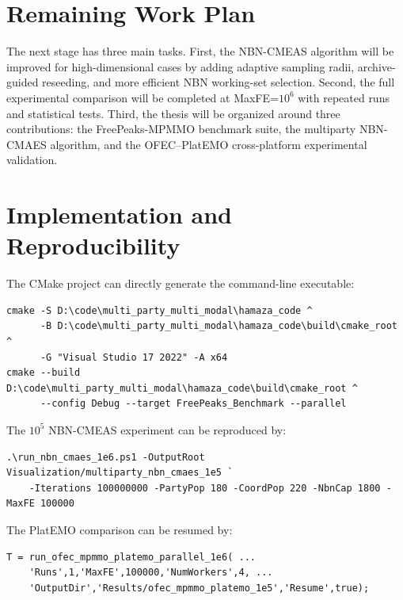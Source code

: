\documentclass[12pt,a4paper]{article}
\newcommand{\code}[1]{\texttt{#1}}
\begin{document}
\section{Remaining Work Plan}

The next stage has three main tasks. First, the NBN-CMEAS algorithm will be improved
for high-dimensional cases by adding adaptive sampling radii, archive-guided reseeding,
and more efficient NBN working-set selection. Second, the full experimental comparison
will be completed at MaxFE=$10^6$ with repeated runs and statistical tests. Third, the
thesis will be organized around three contributions: the FreePeaks-MPMMO benchmark
suite, the multiparty NBN-CMAES algorithm, and the OFEC--PlatEMO cross-platform
experimental validation.

\section*{Implementation and Reproducibility}

The CMake project can directly generate the command-line executable:
\begin{verbatim}
cmake -S D:\code\multi_party_multi_modal\hamaza_code ^
      -B D:\code\multi_party_multi_modal\hamaza_code\build\cmake_root ^
      -G "Visual Studio 17 2022" -A x64
cmake --build D:\code\multi_party_multi_modal\hamaza_code\build\cmake_root ^
      --config Debug --target FreePeaks_Benchmark --parallel
\end{verbatim}

The $10^5$ NBN-CMEAS experiment can be reproduced by:
\begin{verbatim}
.\run_nbn_cmaes_1e6.ps1 -OutputRoot Visualization/multiparty_nbn_cmaes_1e5 `
    -Iterations 100000000 -PartyPop 180 -CoordPop 220 -NbnCap 1800 -MaxFE 100000
\end{verbatim}

The PlatEMO comparison can be resumed by:
\begin{verbatim}
T = run_ofec_mpmmo_platemo_parallel_1e6( ...
    'Runs',1,'MaxFE',100000,'NumWorkers',4, ...
    'OutputDir','Results/ofec_mpmmo_platemo_1e5','Resume',true);
\end{verbatim}
\end{document}
